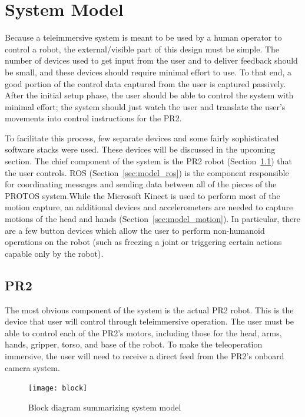 \documentclass{sig-alternate}
\begin{document}
\section{System Model}
\label{sec:system_model}
Because a teleimmersive system is meant to be used by a human 
operator to control a robot, the external/visible part of this
design must be simple. The number of devices used to get input from the user 
and to deliver feedback should be small, and these devices should require
minimal effort to use. To that
end, a good portion of the control data captured from the user is captured
passively. After the initial setup phase, the user should be able to control
the system with minimal effort; the system should just watch the user and
translate the user's movements into control instructions for the PR2.

To facilitate this process, few separate devices and some
fairly sophisticated software stacks were used. These devices will be discussed
in the upcoming section. The chief component of the system is the PR2 robot (Section~\ref{sec:model_PR2}) that
the user controls. ROS (Section~\ref{sec:model_ros}) is the component responsible for coordinating messages
and sending data between all of the pieces of the PROTOS system.While the
Microsoft Kinect is used to perform most of the motion capture, an additional
devices and accelerometers are needed to capture motions of the head and hands (Section~\ref{sec:model_motion}). 
In particular, there are a few button devices which allow the user to
perform non-humanoid operations on the robot (such as freezing a joint or
triggering certain actions capable only by the robot).

\subsection{PR2}
\label{sec:model_PR2}
The most obvious component of the system is the actual PR2 robot. This is the
device that user will control through teleimmersive operation. The user must
be able to control each of the PR2's motors, including those for the head,
arms, hands, gripper, torso, and base of the robot. To make the teleoperation
immersive, the user will need to receive a direct feed from the PR2's onboard
camera system.

\begin{figure}[htb] 
	\begin{center}
		\texttt{[image: block]}
	\end{center}
	\caption{Block diagram summarizing system model}
	\label{fig:some_graph}
\end{figure}
\end{document}
